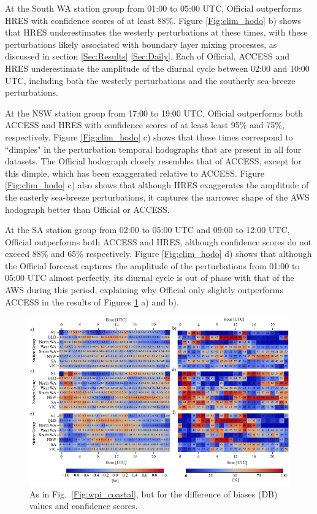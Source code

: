 \documentclass[twocol]{ametsoc}
\begin{document}
At the South WA station group from 01:00 to 05:00 UTC, Official outperforms HRES with confidence scores of at least $88\%$. Figure \ref{Fig:clim_hodo} b) shows that HRES underestimates the westerly perturbations at these times, with these perturbations likely associated with boundary layer mixing processes, as discussed in section \ref{Sec:Results} \ref{Sec:Daily}. Each of Official, ACCESS and HRES underestimate the amplitude of the diurnal cycle between 02:00 and 10:00 UTC, including both the westerly perturbations and the southerly sea-breeze perturbations. 

At the NSW station group from 17:00 to 19:00 UTC, Official outperforms both ACCESS and HRES with confidence scores of at least least 95\% and 75\%, respectively. Figure \ref{Fig:clim_hodo} c) shows that these times correspond to ``dimples" in the perturbation temporal hodographs that are present in all four datasets. The Official hodograph closely resembles that of ACCESS, except for this dimple, which has been exaggerated relative to ACCESS. Figure \ref{Fig:clim_hodo} c) also shows that although HRES exaggerates the amplitude of the easterly sea-breeze perturbations, it captures the narrower shape of the AWS hodograph better than Official or ACCESS.

At the SA station group from 02:00 to 05:00 UTC and 09:00 to 12:00 UTC, Official outperforms both ACCESS and HRES, although confidence scores do not exceed 88\% and 65\% respectively. Figure \ref{Fig:clim_hodo} d) shows that although the Official forecast captures the amplitude of the perturbations from 01:00 to 05:00 UTC almost perfectly, its diurnal cycle is out of phase with that of the AWS during this period, explaining why Official only slightly outperforms ACCESS in the results of Figures \ref{Fig:cwpi_coastal} a) and b).

\begin{figure}
\centering
\includegraphics[width=39pc]{cwpi_coastal.pdf}
\caption{As in Fig.~\ref{Fig:wpi_coastal}, but for the difference of biases (DB) values and confidence scores.}
\label{Fig:cwpi_coastal}
\end{figure}
\end{document}
